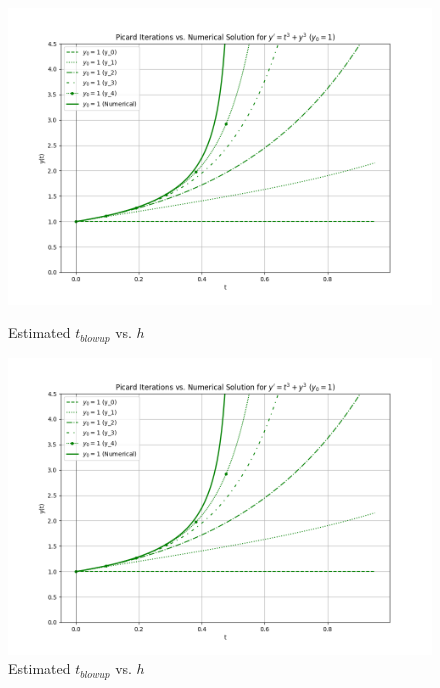 \documentclass{article}
\begin{document}
\begin{figure}[htbp]
    \centering
    \begin{minipage}[b]{0.25\textwidth}
        \centering
        \includegraphics[width=\textwidth]{pic/Picard_1.png }
        \caption{Estimated $t_{blowup}$ vs. $h$}
        \label{fig:picard_1}
    \end{minipage}
    \hspace{0.05\textwidth}
    \begin{minipage}[b]{0.25\textwidth}
        \centering
        \includegraphics[width=\textwidth]{pic/Picard_1.png }
        \caption{Estimated $t_{blowup}$ vs. $h$}
        \label{fig:picard_1}
    \end{minipage}
    \hspace{0.05\textwidth}
    \begin{minipage}[b]{0.25\textwidth}

\end{minipage}
\end{figure}
\end{document}
